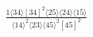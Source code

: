 \documentclass[varwidth, border=5pt]{standalone}
\begin{document}
\begin{my}
$\begin{gathered}
\scriptscriptstyle\frac{1⟨34⟩[34]^2⟨25⟩⟨24⟩⟨15⟩}{⟨14⟩^2⟨23⟩⟨45⟩^2[45]^2}
\end{gathered}$
\end{my}
\end{document}

